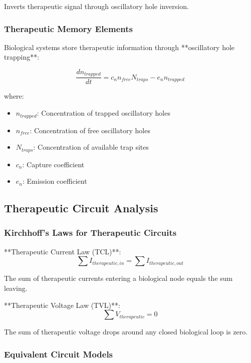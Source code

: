 \documentclass[12pt,a4paper]{article}
\begin{document}
Inverts therapeutic signal through oscillatory hole inversion.

\subsubsection{Therapeutic Memory Elements}

Biological systems store therapeutic information through **oscillatory hole trapping**:

\begin{equation}
\frac{dn_{trapped}}{dt} = c_n n_{free} N_{traps} - e_n n_{trapped}
\end{equation}

where:
\begin{itemize}
\item $n_{trapped}$: Concentration of trapped oscillatory holes
\item $n_{free}$: Concentration of free oscillatory holes
\item $N_{traps}$: Concentration of available trap sites
\item $c_n$: Capture coefficient
\item $e_n$: Emission coefficient
\end{itemize}

\subsection{Therapeutic Circuit Analysis}

\subsubsection{Kirchhoff's Laws for Therapeutic Circuits}

**Therapeutic Current Law (TCL)**:
\begin{equation}
\sum I_{therapeutic,in} = \sum I_{therapeutic,out}
\end{equation}

The sum of therapeutic currents entering a biological node equals the sum leaving.

**Therapeutic Voltage Law (TVL)**:
\begin{equation}
\sum V_{therapeutic} = 0
\end{equation}

The sum of therapeutic voltage drops around any closed biological loop is zero.

\subsubsection{Equivalent Circuit Models}
\end{document}
